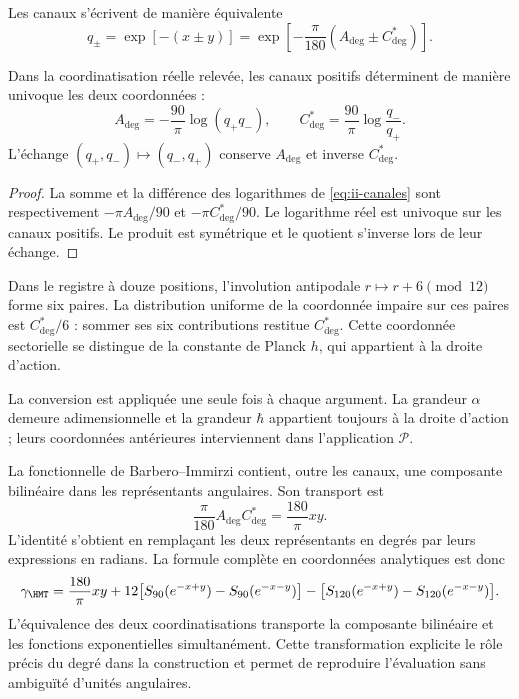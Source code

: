 Les canaux s'écrivent de manière équivalente
\begin{equation}
 q_\pm=\exp[-(x\pm y)]
 =\exp\!\left[-\frac{\pi}{180}(A_{\deg}\pm C^*_{\deg})\right].
\label{eq:ii-canales}
\end{equation}
\begin{proposition}
\label{prop:ii-inversion-canales-angulares}
Dans la coordinatisation réelle relevée, les canaux positifs déterminent
de manière univoque les deux coordonnées :
\[
 A_{\deg}=-\frac{90}{\pi}\log(q_+q_-),\qquad
 C^*_{\deg}=\frac{90}{\pi}\log\frac{q_-}{q_+}.
\]
L'échange \((q_+,q_-)\mapsto(q_-,q_+)\) conserve
\(A_{\deg}\) et inverse \(C^*_{\deg}\).
\end{proposition}
\begin{proof}
La somme et la différence des logarithmes de
\eqref{eq:ii-canales} sont respectivement
\(-\pi A_{\deg}/90\) et \(-\pi C^*_{\deg}/90\).
Le logarithme réel est univoque sur les canaux positifs.
Le produit est symétrique et le quotient s'inverse lors de leur échange.
\end{proof}
Dans le registre à douze positions, l'involution antipodale
\(r\mapsto r+6\pmod {12}\) forme six paires. La distribution
uniforme de la coordonnée impaire sur ces paires est
\(C^*_{\deg}/6\) : sommer ses six contributions restitue
\(C^*_{\deg}\). Cette coordonnée sectorielle se distingue de
la constante de Planck \(h\), qui appartient à la droite d'action.

La conversion est appliquée une seule fois à chaque argument. La grandeur
\(\alpha\) demeure adimensionnelle et la grandeur \(\hbar\)
appartient toujours à la droite d'action ; leurs coordonnées antérieures
interviennent dans l'application \(\mathcal P\).

La fonctionnelle de Barbero--Immirzi contient, outre les canaux, une
composante bilinéaire dans les représentants angulaires. Son transport est
\begin{equation}
 \frac{\pi}{180}A_{\deg}C^*_{\deg}
 =\frac{180}{\pi}xy.
 \label{eq:ii-barbero-cartas}
\end{equation}
L'identité s'obtient en remplaçant les deux représentants en degrés
par leurs expressions en radians. La formule complète en
coordonnées analytiques est donc
\[
 \gamma_{\HMT}
 =\frac{180}{\pi}xy
 +12\bigl[S_{90}(e^{-x+y})-S_{90}(e^{-x-y})\bigr]
 -\bigl[S_{120}(e^{-x+y})-S_{120}(e^{-x-y})\bigr].
\]
L’équivalence des deux coordinatisations transporte la composante bilinéaire
et les fonctions exponentielles simultanément. Cette transformation
explicite le rôle précis du degré dans la construction et permet
de reproduire l’évaluation sans ambiguïté d’unités angulaires.

